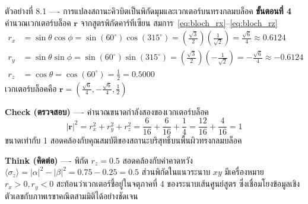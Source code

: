 \begin{psctbox}{ตัวอย่างที่ 8.1 ---- การแปลงสถานะคิวบิตเป็นพิกัดมุมและเวกเตอร์บนทรงกลมบล็อค}
\textbf{ขั้นตอนที่ 4} คำนวณเวกเตอร์บล็อค $\mathbf{r}$
จากสูตรพิกัดคาร์ทีเซียน สมการ~\eqref{eq:bloch_rx}--\eqref{eq:bloch_rz}
\begin{align*}
r_x &= \sin\theta \cos\phi = \sin(60^\circ) \cos(315^\circ) = \left(\frac{\sqrt{3}}{2}\right)\left(\frac{1}{\sqrt{2}}\right) = \frac{\sqrt{6}}{4} \approx 0.6124 \\
r_y &= \sin\theta \sin\phi = \sin(60^\circ) \sin(315^\circ) = \left(\frac{\sqrt{3}}{2}\right)\left(-\frac{1}{\sqrt{2}}\right) = -\frac{\sqrt{6}}{4} \approx -0.6124 \\
r_z &= \cos\theta = \cos(60^\circ) = \frac{1}{2} = 0.5000
\end{align*}
เวกเตอร์บล็อคคือ $\mathbf{r} = \left( \frac{\sqrt{6}}{4}, -\frac{\sqrt{6}}{4}, \frac{1}{2} \right)$

\textbf{Check (ตรวจสอบ)} ---- คำนวณขนาดกำลังสองของเวกเตอร์บล็อค
\begin{equation*}
|\mathbf{r}|^2 = r_x^2 + r_y^2 + r_z^2 = \frac{6}{16} + \frac{6}{16} + \frac{1}{4} = \frac{12}{16} + \frac{4}{16} = 1
\end{equation*}
ขนาดเท่ากับ 1 สอดคล้องกับคุณสมบัติของสถานะบริสุทธิ์บนพื้นผิวทรงกลมบล็อค

\textbf{Think (คิดต่อ)} ---- พิกัด $r_z = 0.5$ สอดคล้องกับค่าคาดหวัง $\langle \sigma_z \rangle = |\alpha|^2 - |\beta|^2 = 0.75 - 0.25 = 0.5$ ส่วนพิกัดในแนวระนาบ $xy$ มีเครื่องหมาย $r_x > 0, r_y < 0$ สะท้อนว่าเวกเตอร์ชี้อยู่ในจตุภาคที่ 4 ของระนาบเส้นศูนย์สูตร ซึ่งเชื่อมโยงข้อมูลเชิงตัวเลขกับภาพเรขาคณิตสามมิติได้อย่างชัดเจน
\end{psctbox}

